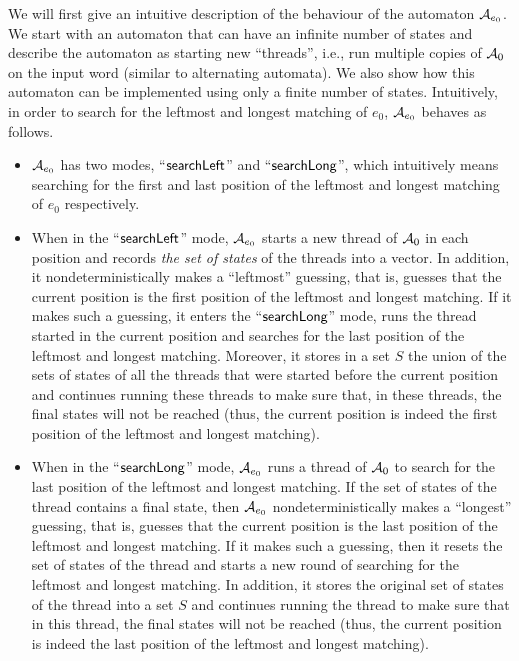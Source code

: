 %
We will first give an intuitive description of the behaviour of the automaton $\mathcal{A}_{e_0}$.
We start with an automaton that can have an infinite number of states and describe the automaton as starting new ``threads'', i.e., run multiple copies of $\mathcal{A}_0$ on the input word (similar to alternating automata).
We also show how this automaton can be implemented using only a finite number of states.
Intuitively, in order to search for the leftmost and longest matching of $e_0$, $\mathcal{A}_{e_0}$ behaves as follows.
\begin{itemize}
\item $\mathcal{A}_{e_0}$ has two modes, ``$\mathsf{searchLeft}$'' and ``$\mathsf{searchLong}$'', which intuitively means searching  for the first and last position of the leftmost and longest matching of $e_0$ respectively.
	\item When in the ``$\mathsf{searchLeft}$'' mode, $\mathcal{A}_{e_0}$ starts a new thread of $\mathcal{A}_0$ in each position and records \emph{the set of states} of the threads into a vector. 
    In addition, it nondeterministically makes a ``leftmost'' guessing, that is, guesses that the current position is the first position of the leftmost and longest matching. 
    If it makes such a guessing, it enters the ``$\mathsf{searchLong}$'' mode, runs the thread started in the current position and searches for the last position of the leftmost and longest matching. 
    Moreover, it stores in a set $S$ the union of the sets of states of all the threads that were started before the current position and continues running these threads to make sure that, in these threads, the final states will not be reached (thus, the current position is indeed the first position of the leftmost and longest matching).
	\item When in the ``$\mathsf{searchLong}$'' mode, $\mathcal{A}_{e_0}$ runs a thread of $\mathcal{A}_{0}$ to search for the last position of the leftmost and longest matching. 
    If the set of states of the thread contains a final state, then $\mathcal{A}_{e_0}$ nondeterministically makes a ``longest'' guessing, that is, guesses that the current position is the last position of the leftmost and longest matching. 
    If it makes such a guessing, then it resets the set of states of the thread and starts a new round of searching for the leftmost and longest matching. 
    In addition, it stores the original set of states of the thread into a set $S$ and continues running the thread to make sure that in this thread, the final states  will not be reached (thus, the current position is indeed the last position of the leftmost and longest matching).

\end{itemize}
